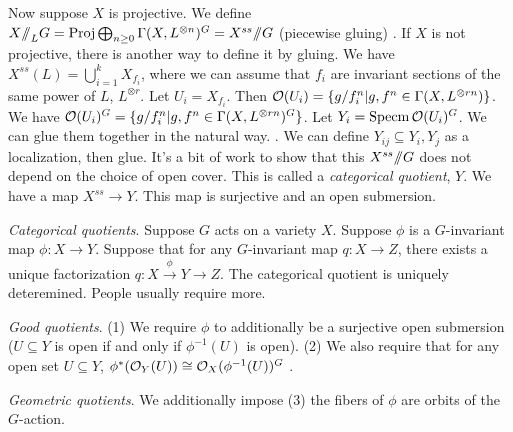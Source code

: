 \bigskip

Now suppose $X$ is projective. We define $X\mbox{\rm /\!\!/}_L G=\operatorname{Proj} \bigoplus_{n\ge 0} \Gamma(X,L^{\otimes n})^G=X^{ss}\mbox{\rm /\!\!/} G$ (piecewise gluing) . If $X$ is not projective, there is another way to define it by gluing. We have $X^{ss}(L) = \bigcup_{i=1}^k X_{f_i}$, where we can assume that $f_i$ are invariant sections of the same power of $L$, $L^{\otimes r}$. Let $U_i=X_{f_i}$. Then $\mathcal{O}(U_i)=\{g/f_i^n|g,f^n\in \Gamma(X,L^{\otimes rn})\}$. We have $\mathcal{O}(U_i)^G=\{g/f_i^n|g,f^n\in \Gamma(X,L^{\otimes rn})^G\}$. Let $Y_i=\operatorname{Specm} \mathcal{O}(U_i)^G$. We can glue them together in the natural way. . We can define $Y_{ij}\subseteq Y_i, Y_j$ as a localization, then glue. It's a bit of work to show that this $X^{ss}\mbox{\rm /\!\!/} G$ does not depend on the choice of open cover. This is called a \emph{categorical quotient}, $Y$. We have a map $X^{ss}\to Y$. This map is surjective and an open submersion.

\emph{Categorical quotients}. Suppose $G$ acts on a variety $X$. Suppose $\phi$ is a $G$-invariant map $\phi\colon X\to Y$. Suppose that for any $G$-invariant map $q\colon X\to Z$, there exists a unique factorization $q\colon X\xrightarrow\phi Y\to Z$. The categorical quotient is uniquely deteremined. People usually require more.

\emph{Good quotients}. (1) We require $\phi$ to additionally be a surjective open submersion ($U\subseteq Y$ is open if and only if $\phi^{-1}(U)$ is open). (2) We also require that for any open set $U\subseteq Y$, $\phi^*(\mathcal{O}_Y(U))\cong \mathcal{O}_X(\phi^{-1}(U))^G$ .

\emph{Geometric quotients}. We additionally impose (3) the fibers of $\phi$ are orbits of the $G$-action.

